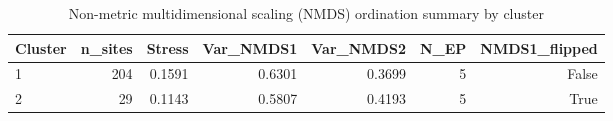 \begin{table}[htbp]
  \centering
  \caption{Non-metric multidimensional scaling (NMDS) ordination summary by cluster}
  \label{tab:04_bray_curtis_NMDS_nmds_summary}
  \small
  \begin{tabular}{lrrrrrr}
    \toprule
    Cluster & n\_sites & Stress & Var\_NMDS1 & Var\_NMDS2 & N\_EP & NMDS1\_flipped \\
    \midrule
    1 & 204 & 0.1591 & 0.6301 & 0.3699 & 5 & False \\
    2 & 29 & 0.1143 & 0.5807 & 0.4193 & 5 & True \\
    \bottomrule
  \end{tabular}
\end{table}

